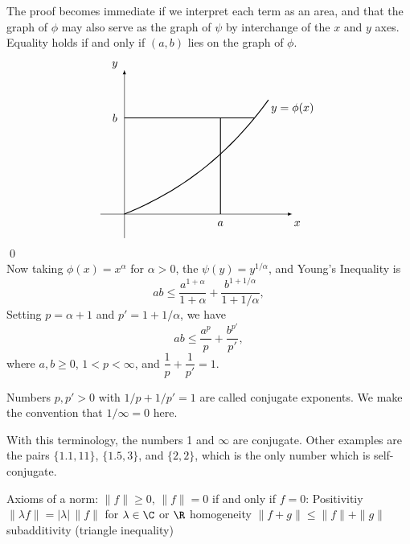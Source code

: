 \pf The proof becomes immediate if we interpret each term as an area, and that the graph of $\phi$ may also serve as the graph of $\psi$ by interchange of the $x$ and $y$ axes. Equality holds if and only if $(a,b)$ lies on the graph of $\phi$. 
	\[
	\begin{tikzpicture}[scale=1.5,every node/.style={scale=1}]
	\node at (3.5,2.2) {$y=\phi(x)$}; 
	\node at (3.6, -0.2) {$x$};
	\node at (-0.2, 3.1) {$y$};
	\node at (2,-0.2) {$a$};
	\node at (-0.2,2) {$b$};

	\draw[thin,-latex] (-0.5,0) -- (3.5,0);
	\draw[thin,-latex] (0,-0.5) -- (0,3);
	\draw[thick,domain= 0:3,smooth,variable=\x] plot ({\x},{1.5^\x-1});
	\draw[thick, domain= 0:2,smooth,variable=\x] plot ({2},{\x});
	\draw[thick,domain= 0:2.70951,smooth,variable=\x] plot ({\x},{2});
	\end{tikzpicture}
	\] \qed \\


Now taking $\phi(x)= x^\alpha$ for $\alpha>0$, the $\psi(y)= y^{1/\alpha}$, and Young's Inequality is 
	\[
	ab \leq \dfrac{a^{1+\alpha}}{1+\alpha} + \dfrac{b^{1+1/\alpha}}{1+1/\alpha},
	\]
Setting $p= \alpha+1$ and $p'= 1+1/\alpha$, we have
	\[
	ab \leq \dfrac{a^p}{p} + \dfrac{b^{p'}}{p'}, 
	\]
where $a,b \geq 0$, $1<p<\infty$, and $\dfrac{1}{p} + \dfrac{1}{p'} = 1$.


\begin{dfn}
Numbers $p,p'>0$ with $1/p+1/p'=1$ are called conjugate exponents. We make the convention that $1/\infty=0$ here.
\end{dfn}


With this terminology, the numbers 1 and $\infty$ are conjugate. Other examples are the pairs $\{1.1,11\}$, $\{1.5,3\}$, and $\{2,2\}$, which is the only number which is self-conjugate. 


























Axioms of a norm: 
$\|f\| \geq 0$, $\|f\|=0$ if and only if $f=0$: Positivitiy
$\|\lambda f\|= |\lambda| \, \|f\|$ for $\lambda \in \C$ or $\R$ homogeneity
$\|f+g\| \leq \|f\|+\|g\|$ subadditivity (triangle inequality)

